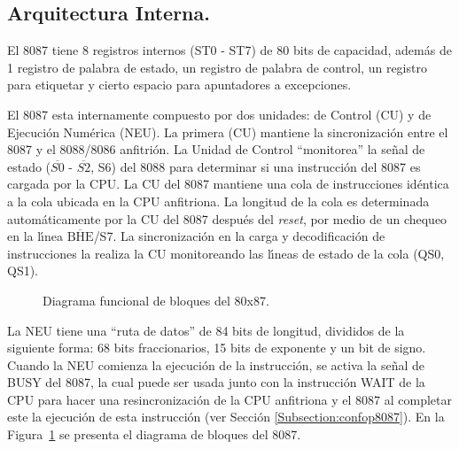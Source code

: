 
\subsection{Arquitectura Interna.}
\label{Subsection:arqint8087}

El 8087 tiene 8 registros internos (ST0 - ST7) de 80 bits de capacidad, adem\'as de 1 registro %
de palabra de estado, un registro de palabra de control, un registro para etiquetar y cierto %
espacio para apuntadores a excepciones.

El 8087 esta internamente compuesto por dos unidades: de Control (CU) y de Ejecuci\'on %
Num\'erica (NEU). La primera (CU) mantiene la sincronizaci\'on entre el 8087 y el 8088/8086 %
anfitri\'on. La Unidad de Control ``monitorea'' la se\~nal de estado ($\overline{S0}$ - %
$\overline{S2}$, S6) del 8088 para determinar si una instrucci\'on del 8087 es cargada por la %
CPU. La CU del 8087 mantiene una cola de instrucciones id\'entica a la cola ubicada en la CPU %
anfitriona. La longitud de la cola es determinada autom\'aticamente por la CU del 8087 %
despu\'es del {\it reset\/}, por medio de un chequeo en la l\'{\i}nea %
$\overline{\mbox{BHE}}$/S7. La sincronizaci\'on en la carga y decodificaci\'on de %
instrucciones la realiza la CU monitoreando las l\'{\i}neas de estado de la cola (QS0, QS1). 

\begin{figure}[!htb]
\vskip 5mm
\vskip 80mm                     
\caption{Diagrama funcional de bloques del 80x87.}
\label{8087:bloques}
\end{figure}

La NEU tiene una ``ruta de datos'' de 84 bits de longitud, divididos de la siguiente forma: 68 %
bits fraccionarios, 15 bits de exponente y un bit de signo. Cuando la NEU comienza la %
ejecuci\'on de la instrucci\'on, se activa la se\~nal de BUSY del 8087, la cual puede ser usada %
junto con la instrucci\'on WAIT de la CPU para hacer una resincronizaci\'on de la CPU %
anfitriona y el 8087 al completar este la ejecuci\'on de esta instrucci\'on (ver Secci\'on %
\ref{Subsection:confop8087}). En la Figura~\ref{8087:bloques} se presenta el diagrama de %
bloques del 8087.


